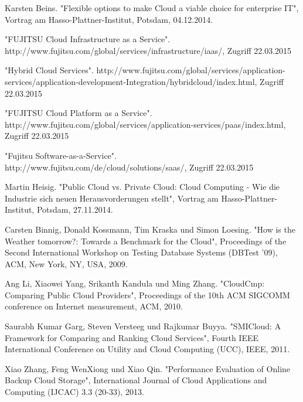\ifCLASSOPTIONcaptionsoff
  \newpage
\fi

\begin{thebibliography}{1}

Karsten Beins. "Flexible options to make Cloud a viable choice for enterprise IT", Vortrag am Hasso-Plattner-Institut, Potsdam, 04.12.2014.

"FUJITSU Cloud Infrastructure as a Service". http://www.fujitsu.com/global/services/infrastructure/iaas/, Zugriff 22.03.2015

"Hybrid Cloud Services". http://www.fujitsu.com/global/services/application-services/application-development-Integration/hybridcloud/index.html, Zugriff 22.03.2015

"FUJITSU Cloud Platform as a Service". http://www.fujitsu.com/global/services/application-services/paas/index.html, Zugriff 22.03.2015

"Fujitsu Software-as-a-Service". http://www.fujitsu.com/de/cloud/solutions/saas/, Zugriff 22.03.2015
  
Martin Heisig. "Public Cloud vs. Private Cloud: Cloud Computing - Wie die Industrie sich neuen Herausvorderungen stellt", Vortrag am Hasso-Plattner-Institut, Potsdam, 27.11.2014.

Carsten Binnig, Donald Kossmann, Tim Kraska und Simon Loesing. "How is the Weather tomorrow?: Towards a Benchmark for the Cloud", Proceedings of the Second International Workshop on Testing Database Systems (DBTest '09), ACM, New York, NY, USA, 2009.

Ang Li, Xiaowei Yang, Srikanth Kandula und Ming Zhang. "CloudCmp: Comparing Public Cloud Providers", Proceedings of the 10th ACM SIGCOMM conference on Internet measurement, ACM, 2010.

Saurabh Kumar Garg, Steven Versteeg und Rajkumar Buyya. "SMICloud: A Framework for Comparing and Ranking Cloud Services", Fourth IEEE International Conference on Utility and Cloud Computing (UCC), IEEE, 2011.

Xiao Zhang, Feng WenXiong und Xiao Qin. "Performance Evaluation of Online Backup Cloud Storage", International Journal of Cloud Applications and Computing (IJCAC) 3.3 (20-33), 2013.


\end{thebibliography}
